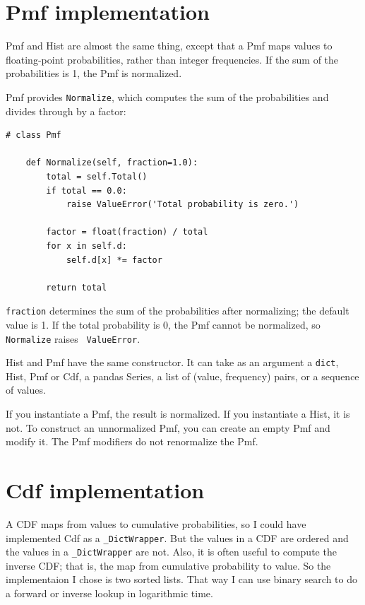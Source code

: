 \documentclass[12pt]{book}
\begin{document}
\section{Pmf implementation}

Pmf and Hist are almost the same thing, except that a Pmf
maps values to floating-point probabilities, rather than integer
frequencies.  If the sum of the probabilities is 1, the Pmf is normalized.

Pmf provides {\tt Normalize}, which computes the sum of the
probabilities and divides through by a factor:

\begin{verbatim}
# class Pmf

    def Normalize(self, fraction=1.0):
        total = self.Total()
        if total == 0.0:
            raise ValueError('Total probability is zero.')

        factor = float(fraction) / total
        for x in self.d:
            self.d[x] *= factor

        return total
\end{verbatim}

{\tt fraction} determines the sum of the probabilities after
normalizing; the default value is 1.  If the total probability is 0,
the Pmf cannot be normalized, so {\tt Normalize} raises {\tt
  ValueError}.

Hist and Pmf have the same constructor.  It can take
as an argument a {\tt dict}, Hist, Pmf or Cdf, a pandas
Series, a list of (value, frequency) pairs, or a sequence of values.

If you instantiate a Pmf, the result is normalized.  If you
instantiate a Hist, it is not.  To construct an unnormalized Pmf,
you can create an empty Pmf and modify it.  The Pmf modifiers do
not renormalize the Pmf.


\section{Cdf implementation}

A CDF maps from values to cumulative probabilities, so I could have
implemented Cdf as a \verb"_DictWrapper".  But the values in a CDF are
ordered and the values in a \verb"_DictWrapper" are not.  Also, it is
often useful to compute the inverse CDF; that is, the map from
cumulative probability to value.  So the implementaion I chose is two
sorted lists.  That way I can use binary search to do a forward or
inverse lookup in logarithmic time.
\end{document}
